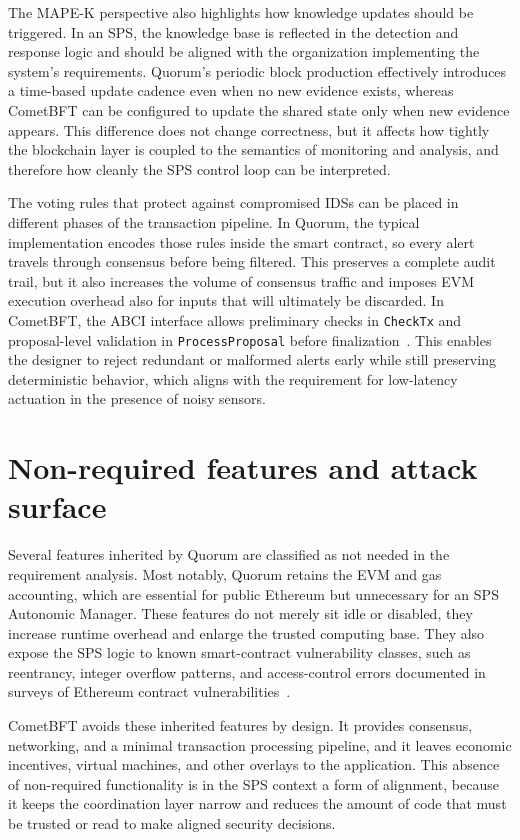 The MAPE-K perspective also highlights how knowledge updates should be triggered. In an SPS, the knowledge base is reflected in the detection and response logic and should be aligned with the organization implementing the system's requirements. Quorum's periodic block production effectively introduces a time-based update cadence even when no new evidence exists, whereas CometBFT can be configured to update the shared state only when new evidence appears. This difference does not change correctness, but it affects how tightly the blockchain layer is coupled to the semantics of monitoring and analysis, and therefore how cleanly the SPS control loop can be interpreted.

The voting rules that protect against compromised IDSs can be placed in different phases of the transaction pipeline. In Quorum, the typical implementation encodes those rules inside the smart contract, so every alert travels through consensus before being filtered. This preserves a complete audit trail, but it also increases the volume of consensus traffic and imposes EVM execution overhead also for inputs that will ultimately be discarded. In CometBFT, the ABCI interface allows preliminary checks in \texttt{CheckTx} and proposal-level validation in \texttt{ProcessProposal} before finalization~\cite{abciOverview}. This enables the designer to reject redundant or malformed alerts early while still preserving deterministic behavior, which aligns with the requirement for low-latency actuation in the presence of noisy sensors.


\section{Non-required features and attack surface}
Several features inherited by Quorum are classified as not needed in the requirement analysis. Most notably, Quorum retains the EVM and gas accounting, which are essential for public Ethereum but unnecessary for an SPS Autonomic Manager. These features do not merely sit idle or disabled, they increase runtime overhead and enlarge the trusted computing base. They also expose the SPS logic to known smart-contract vulnerability classes, such as reentrancy, integer overflow patterns, and access-control errors documented in surveys of Ethereum contract vulnerabilities~\cite{atzei2017survey, kushwaha2022systematic}.

CometBFT avoids these inherited features by design. It provides consensus, networking, and a minimal transaction processing pipeline, and it leaves economic incentives, virtual machines, and other overlays to the application. This absence of non-required functionality is in the SPS context a form of alignment, because it keeps the coordination layer narrow and reduces the amount of code that must be trusted or read to make aligned security decisions.

